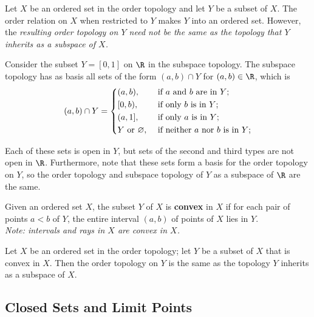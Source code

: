 \begin{remark}
Let $X$ be an ordered set in the order topology and let $Y$ be a subset of $X$. The order relation on $X$ when restricted to $Y$ makes $Y$ into an ordered set.
However, the \textit{resulting order topology on $Y$ need not be the same as the topology that $Y$ inherits as a subspace of $X$.}
\end{remark}

\begin{eg}
Consider the subset $Y = [0, 1]$ on $\R$ in the subspace topology. The subspace topology has as basis all sets of the form $(a, b) \cap Y$
for $(a, b) \in \R$, which is
\[
    (a, b) \cap Y = \begin{dcases}
        (a, b), &\text{ if $a$ and $b$ are in $Y$}  ;\\
        [0, b), &\text{ if only $b$ is in $Y$}  ;\\
        (a, 1], &\text{ if only $a$ is in $Y$} ;\\
        Y \text{ or } \varnothing, &\text{ if neither $a$ nor $b$ is in $Y$};
    \end{dcases}
\]

Each of these sets is open in $Y$, but sets of the second and third types are not open in $\R$. 
Furthermore, note that these sets form a basis for the order topology on $Y$, so
the order topology and subspace topology of $Y$ as a subspace of $\R$ are the same.
\end{eg}

\begin{definition}
Given an ordered set $X$, the subset $Y$ of $X$ is \textbf{convex} in $X$ if for each pair of points $a < b$ of $Y$, the entire
interval $(a, b)$ of points of $X$ lies in $Y$.\\

\textit{Note: intervals and rays in $X$ are convex in $X$.}
\end{definition}

\begin{theorem}
Let $X$ be an ordered set in the order topology; let $Y$ be a subset of $X$ that is convex in $X$. Then the order topology on $Y$ is the
same as the topology $Y$ inherits as a subspace of $X$.
\end{theorem}

\subsection{Closed Sets and Limit Points}


